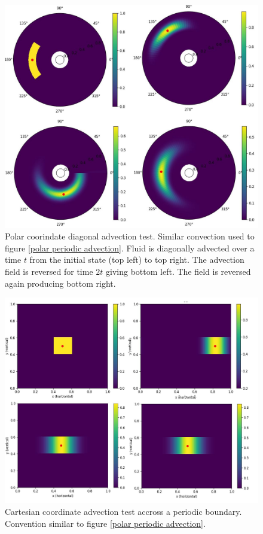 \documentclass{article}
\begin{document}
\begin{figure}[h!]
	\centering
	\includegraphics{polarDiagonal/PolarDiagonalFigure.jpg}
	\caption{ Polar coorindate diagonal advection test. Similar convection used to figure \ref{polar periodic advection}. Fluid is diagonally advected over a time $t$ from the initial state (top left) to top right. The advection field is reversed for time $2t$ giving bottom left. The field is reversed again producing bottom right.}
	\label{polar diagonal advection}
\end{figure}
 
\begin{figure}[h!]
	\centering
	\includegraphics{cartesianPeriodic/CartesianPeriodicFigure.jpg}
	\caption{Cartesian coordinate advection test accross a periodic boundary. Convention similar to figure \ref{polar periodic advection}.}
	\label{cartesian periodic advection}
\end{figure}
\end{document}
